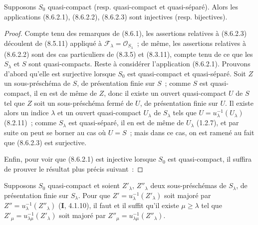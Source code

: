 \begin{proposition}[8.6.3]
\label{IV.8.6.3-fr}
Supposons $S_0$ quasi-compact \textup{(resp.} quasi-compact et quasi-séparé\textup{)}. Alors les
applications \textup{(8.6.2.1), (8.6.2.2), (8.6.2.3)} sont injectives \textup{(resp.}
bijectives\textup{)}.
\end{proposition}

\begin{proof}
Compte tenu des remarques de (8.6.1), les assertions relatives à (8.6.2.3)
découlent de (8.5.11) appliqué à $\mathcal F_\lambda=\mathcal O_{S_\lambda}$~;
de même, les assertions relatives à (8.6.2.2) sont des cas particuliers de
(8.3.5) et (8.3.11), compte tenu de ce que les $S_\lambda$ et $S$ sont
quasi-compacts. Reste à considérer l'application (8.6.2.1). Prouvons d'abord
qu'elle est surjective lorsque $S_0$ est quasi-compact et quasi-séparé. Soit
$Z$ un sous-préschéma de $S$, de présentation finie sur $S$~; comme $S$ est
quasi-compact, il en est de même de $Z$, donc il existe un ouvert
quasi-compact $U$ de $S$ tel que $Z$ soit un sous-préschéma fermé de $U$, de
présentation finie sur $U$. Il existe alors un indice $\lambda$ et un ouvert
quasi-compact $U_\lambda$ de $S_\lambda$ tels que
$U=u_\lambda^{-1}(U_\lambda)$ (8.2.11)~; comme $S_\lambda$ est quasi-séparé, il
en est de même de $U_\lambda$ (1.2.7), et par suite on peut se borner au cas
où $U=S$~; mais dans ce cas, on est ramené au fait que (8.6.2.3) est
surjective.

Enfin, pour voir que (8.6.2.1) est injective lorsque $S_0$ est quasi-compact,
il suffira de prouver le résultat plus précis suivant~:
\end{proof}

\begin{corollary}[8.6.3.1]
\label{IV.8.6.3.1-fr}
Supposons $S_0$ quasi-compact et soient $Z'_\lambda$, $Z''_\lambda$ deux
sous-préschémas de $S_\lambda$, de présentation finie sur $S_\lambda$. Pour
que $Z'=u_\lambda^{-1}(Z'_\lambda)$ soit majoré par
$Z''=u_\lambda^{-1}(Z''_\lambda)$ \textup{(\textbf{I}, 4.1.10)}, il faut et il suffit qu'il
existe $\mu\geq\lambda$ tel que
$Z'_\mu=u_{\lambda\mu}^{-1}(Z'_\lambda)$ soit majoré par
$Z''_\mu=u_{\lambda\mu}^{-1}(Z''_\lambda)$.
\end{corollary}

